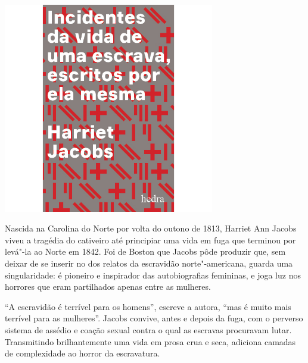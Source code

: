 \begin{center}
\hspace*{.5cm}\includegraphics[width=92mm]{./grid/jacobs.jpg}
\end{center}

\hspace*{-7cm}\hrulefill\hspace*{-7cm}

\medskip

\noindent{}Nascida na Carolina do Norte por volta do outono de 1813, Harriet Ann Jacobs viveu a tragédia do cativeiro até principiar uma vida em fuga que terminou por levá"-la ao Norte em 1842. Foi de Boston que Jacobs pôde produzir {} que, sem deixar de se inserir no {} dos relatos da escravidão norte"-americana, guarda uma singularidade: é pioneiro e inspirador das autobiografias femininas, e joga luz nos horrores que eram partilhados apenas entre as mulheres.

“A escravidão é terrível para os homens”, escreve a autora, “mas é muito mais terrível para as mulheres”. Jacobs convive, antes e depois da fuga, com o perverso sistema de assédio e coação sexual contra o qual as escravas procuravam lutar. Transmitindo brilhantemente uma vida em prosa crua e seca, {} adiciona camadas de complexidade ao horror da escravatura.


\vfill

\hspace*{-.4cm}\begin{minipage}[c]{.5\linewidth}
\small{
{}}
\end{minipage}



